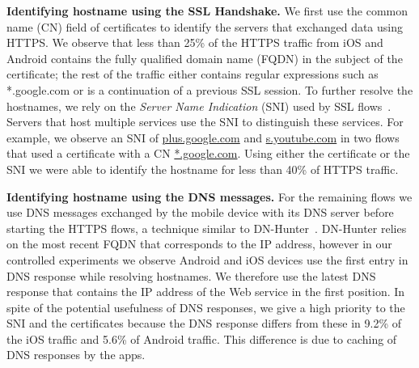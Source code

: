 
\noindent\textbf{Identifying hostname using the SSL Handshake.}
We first use the common name (CN) field of certificates to identify the servers that exchanged data using HTTPS.
We observe that less than 25\% of the HTTPS traffic from iOS and Android contains the fully qualified domain name (FQDN) in the subject of the certificate; the rest of the traffic either contains regular expressions such as *.google.com or is a continuation of a previous SSL session. 
To further resolve the hostnames, we rely on the \emph{Server Name Indication} (SNI) used by SSL flows~\cite{rfc:servernametls}.
Servers that host multiple services use the SNI to distinguish these services.   
For example, we observe an SNI of \url{plus.google.com} and \url{s.youtube.com} in two flows that used a certificate with a CN \url{*.google.com}.
Using either the certificate or the SNI we were able to identify the hostname for less than 40\% of HTTPS traffic.

\noindent\textbf{Identifying hostname using the DNS messages.} 
For the remaining flows we use DNS messages exchanged by the mobile device with its DNS server before starting the HTTPS flows, a technique similar to DN-Hunter~\cite{bermudez:dnhunter}.
DN-Hunter relies on the most recent FQDN that corresponds to the IP address, however in our controlled experiments we observe Android and iOS devices use the first entry in DNS response while resolving hostnames.
We therefore use the latest DNS response that contains the IP address of the Web service in the first position.
In spite of the potential usefulness of DNS responses, we give a high priority to the SNI and the certificates because the DNS response differs from these in 9.2\% of the iOS traffic and 5.6\% of Android traffic.
This difference is due to caching of DNS responses by the apps.

